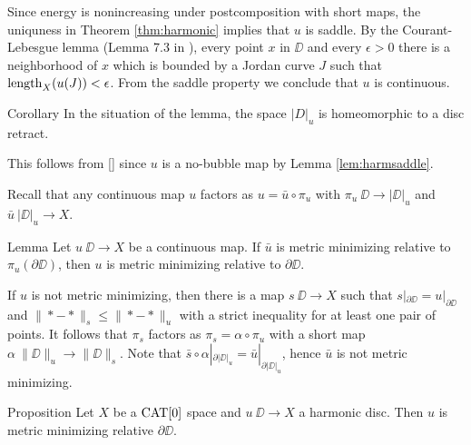\documentclass[a4paper,10pt]{amsart}
\begin{document}
Since energy is nonincreasing under postcomposition with short maps, the uniquness in Theorem \ref{thm:harmonic} implies that
$u$ is saddle. By the Courant-Lebesgue lemma (Lemma 7.3 in \cite{LW}), every point $x$ in $\DD$ and every $\epsilon>0$
there is a neighborhood of $x$ which is bounded by a Jordan curve $J$ such that $\mathop{\rm length}\nolimits_X(u(J))<\epsilon$. From the saddle property we conclude 
that $u$ is continuous.
\qeds

\begin{thm}{Corollary}\label{cor:harmdiscretract}
In the situation of the lemma, the space $|D|_u$ is homeomorphic to a disc retract.
\end{thm}
This follows from \ref{} since $u$ is a no-bubble map by Lemma \ref{lem:harmsaddle}.
\qeds

Recall that any continuous map $u$ factors as $u=\bar u\circ \pi_u$ with $\pi_u\:\DD\to|\DD|_u$ and $\bar u\:|\DD|_u\to X$.


\begin{thm}{Lemma}\label{lem:memicrit}
Let $u\:\DD\to X$ be a continuous map. 
If $\bar u$ is metric minimizing relative to $\pi_u(\partial\DD)$, then $u$ is metric minimizing relative to $\partial\DD$.
\end{thm}

If $u$ is not metric minimizing, then there is a map $s\:\DD\to X$ such that $s|_{\partial\DD}=u|_{\partial\DD}$ and $\|*-*\|_s\leq \|*-*\|_u$
with a strict inequality for at least one pair of points. It follows that $\pi_s$ factors as $\pi_s=\alpha\circ\pi_u$ with a short  map $\alpha\:\|\DD\|_u\to\|\DD\|_s$.
Note that $\bar s\circ\alpha|_{\partial|\DD|_u}=\bar u|_{\partial|\DD|_u}$, hence $\bar u$ is not metric minimizing.
\qeds







 \begin{thm}{Proposition}\label{prop:harmonic}
Let $X$ be a $\mathop{\rm CAT}\nolimits[0]$ space 
and $u\:\DD\to X$ a harmonic disc.
Then $u$ is metric minimizing relative $\partial\DD$.
\end{thm}
\end{document}
